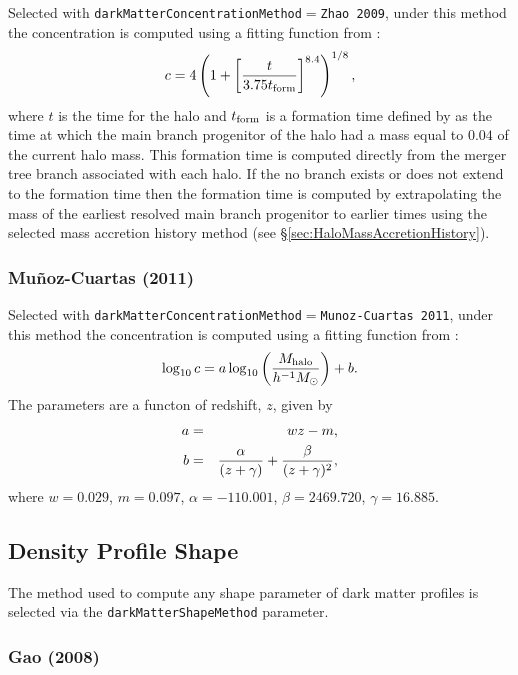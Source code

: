 Selected with {\tt darkMatterConcentrationMethod}$=${\tt Zhao 2009}, under this method the concentration is computed using a fitting function from \cite{zhao_accurate_2009}:
\begin{equation}
 c = 4 \left(1 + \left[ {t  \over 3.75 t_{\rm form}}\right]^{8.4}\right)^{1/8},
\end{equation}
where $t$ is the time for the halo and $t_{\rm form}$ is a formation time defined by \cite{zhao_accurate_2009} as the time at which the main branch progenitor of the halo had a mass equal to $0.04$ of the current halo mass. This formation time is computed directly from the merger tree branch associated with each halo. If the no branch exists or does not extend to the formation time then the formation time is computed by extrapolating the mass of the earliest resolved main branch progenitor to earlier times using the selected mass accretion history method (see \S\ref{sec:HaloMassAccretionHistory}).

\subsubsection{Mu\~noz-Cuartas (2011)}

Selected with {\tt darkMatterConcentrationMethod}$=${\tt Munoz-Cuartas 2011}, under this method the concentration is computed using a fitting function from \cite{munoz-cuartas_redshift_2011}:
\begin{equation}
\log_{10} c = a \log_{10} \left( {M_{\rm halo} \over h^{-1}M_\odot} \right) + b.
\end{equation}
The parameters are a functon of redshift, $z$, given by
\begin{eqnarray}
a &=& wz-m, \\
b &=& {\alpha \over (z+\gamma)} + {\beta \over (z+\gamma)^2},
\end{eqnarray}
where $w=0.029$, $m=0.097$, $\alpha=-110.001$, $\beta=2469.720$, $\gamma=16.885$.

\subsection{Density Profile Shape}\label{sec:DarkMatterProfileShape}

The method used to compute any shape parameter of dark matter profiles is selected via the {\tt darkMatterShapeMethod} parameter.

\subsubsection{Gao (2008)}

